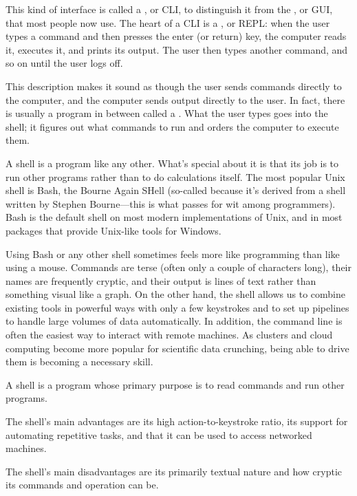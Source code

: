 This kind of interface is called a , or CLI, to distinguish it from the
, or GUI, that most people now
use. The heart of a CLI is a , or REPL: when the user types a command and then presses the enter
(or return) key, the computer reads it, executes it, and prints its
output. The user then types another command, and so on until the user
logs off.

This description makes it sound as though the user sends commands
directly to the computer, and the computer sends output directly to the
user. In fact, there is usually a program in between called a
. What the user types goes into the
shell; it figures out what commands to run and orders the computer to
execute them.

A shell is a program like any other. What's special about it is that its
job is to run other programs rather than to do calculations itself. The
most popular Unix shell is Bash, the Bourne Again SHell (so-called
because it's derived from a shell written by Stephen Bourne---this is
what passes for wit among programmers). Bash is the default shell on
most modern implementations of Unix, and in most packages that provide
Unix-like tools for Windows.

Using Bash or any other shell sometimes feels more like programming than
like using a mouse. Commands are terse (often only a couple of
characters long), their names are frequently cryptic, and their output
is lines of text rather than something visual like a graph. On the other
hand, the shell allows us to combine existing tools in powerful ways
with only a few keystrokes and to set up pipelines to handle large
volumes of data automatically. In addition, the command line is often
the easiest way to interact with remote machines. As clusters and cloud
computing become more popular for scientific data crunching, being able
to drive them is becoming a necessary skill.

\begin{keypoints}
\begin{swcitemize}
\item
  A shell is a program whose primary purpose is to read commands and run
  other programs.
\item
  The shell's main advantages are its high action-to-keystroke ratio,
  its support for automating repetitive tasks, and that it can be used
  to access networked machines.
\item
  The shell's main disadvantages are its primarily textual nature and
  how cryptic its commands and operation can be.
\end{swcitemize}
\end{keypoints}

